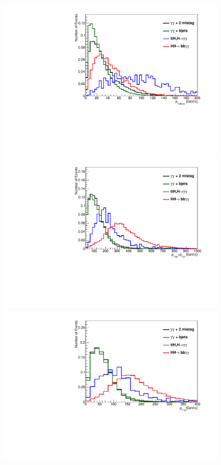\documentclass{cmspaper}
\begin{document}
\begin{figure}
\centering
\includegraphics[scale=0.35, angle=0]{figures/bbggPt_ps_normalized.pdf}	
\includegraphics[scale=0.35, angle=0]{figures/SumbbggPt_ps_normalized.pdf}	
\includegraphics[scale=0.35, angle=0]{figures/dibjetPt_ps_normalized.pdf}	

\end{figure}
\end{document}
